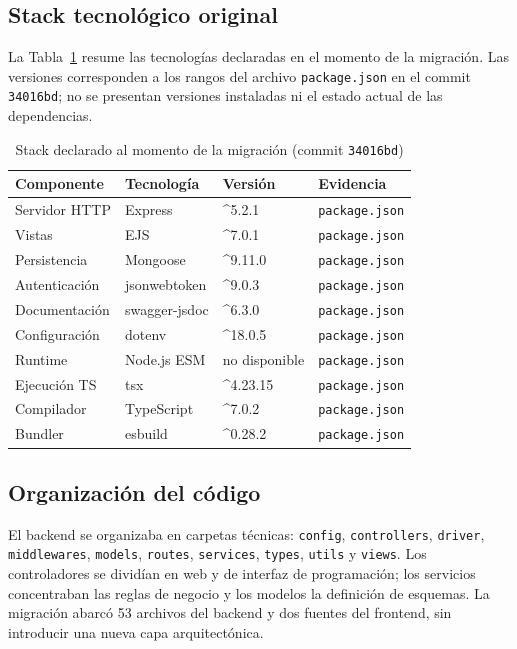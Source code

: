 \documentclass[conference]{IEEEtran}
\begin{document}
\subsection{Stack tecnológico original}
La Tabla~\ref{tab:stack} resume las tecnologías declaradas en el momento de la
migración. Las versiones corresponden a los rangos del archivo
\texttt{package.json} en el commit \texttt{34016bd}; no se presentan versiones
instaladas ni el estado actual de las dependencias.

\begin{table}[!t]
\caption{Stack declarado al momento de la migración (commit \texttt{34016bd})}
\label{tab:stack}
\centering
\footnotesize
\begin{tabular}{@{}>{\raggedright\arraybackslash}p{2.05cm}>{\raggedright\arraybackslash}p{2.05cm}>{\raggedright\arraybackslash}p{1.4cm}>{\raggedright\arraybackslash}p{2.1cm}@{}}
\toprule
Componente & Tecnología & Versión & Evidencia \\
\midrule
Servidor HTTP & Express & \textasciicircum{}5.2.1 & \texttt{package.json} \\
Vistas & EJS & \textasciicircum{}7.0.1 & \texttt{package.json} \\
Persistencia & Mongoose & \textasciicircum{}9.11.0 & \texttt{package.json} \\
Autenticación & jsonwebtoken & \textasciicircum{}9.0.3 & \texttt{package.json} \\
Documentación & swagger-jsdoc & \textasciicircum{}6.3.0 & \texttt{package.json} \\
Configuración & dotenv & \textasciicircum{}18.0.5 & \texttt{package.json} \\
Runtime & Node.js ESM & no disponible & \texttt{package.json} \\
Ejecución TS & tsx & \textasciicircum{}4.23.15 & \texttt{package.json} \\
Compilador & TypeScript & \textasciicircum{}7.0.2 & \texttt{package.json} \\
Bundler & esbuild & \textasciicircum{}0.28.2 & \texttt{package.json} \\
\bottomrule
\end{tabular}
\end{table}

\subsection{Organización del código}
El backend se organizaba en carpetas técnicas: \texttt{config},
\texttt{controllers}, \texttt{driver}, \texttt{middlewares}, \texttt{models},
\texttt{routes}, \texttt{services}, \texttt{types}, \texttt{utils} y
\texttt{views}. Los controladores se dividían en web y de interfaz de
programación; los servicios concentraban las reglas de negocio y los modelos
la definición de esquemas. La migración abarcó 53 archivos del backend y dos
fuentes del frontend, sin introducir una nueva capa arquitectónica.
\end{document}
